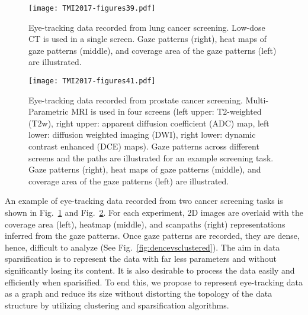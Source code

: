 \documentclass[preprint,12pt]{elsarticle}
\begin{document}
\begin{figure}[h]
\centering
\texttt{[image: TMI2017-figures39.pdf]}
\caption{Eye-tracking data recorded from lung cancer screening. Low-dose CT is used in a single screen. Gaze patterns (right), heat maps of gaze patterns (middle), and coverage area of the gaze patterns (left) are illustrated. \label{fig:data1}}
\end{figure}

\begin{figure}[h]
\centering
\texttt{[image: TMI2017-figures41.pdf]}
\caption{Eye-tracking data recorded from prostate cancer screening. Multi-Parametric MRI is used in four screens (left upper: T2-weighted (T2w), right upper: apparent diffusion coefficient (ADC) map, left lower: diffusion weighted imaging (DWI), right lower: dynamic contrast enhanced (DCE) maps). Gaze patterns across different screens and the paths are illustrated for an example screening task. Gaze patterns (right), heat maps of gaze patterns (middle), and coverage area of the gaze patterns (left) are illustrated. \label{fig:data2}}
\end{figure}

An example of eye-tracking data recorded from two cancer screening tasks is shown in Fig.~\ref{fig:data1} and Fig.~\ref{fig:data2}. For each experiment, 2D images are overlaid with the coverage area (left), heatmap (middle), and scanpaths (right) representations inferred from the gaze patterns. Once gaze patterns are recorded, they are dense, hence, difficult to analyze (See Fig.~\ref{fig:dencevsclustered}). The aim in data sparsification is to represent the data with far less parameters and without significantly losing its content. It is also desirable to process the data easily and efficiently when sparisified. To end this, we propose to represent eye-tracking data as a graph and reduce its size without distorting the topology of the data structure by utilizing clustering and sparsification algorithms. 
\end{document}
